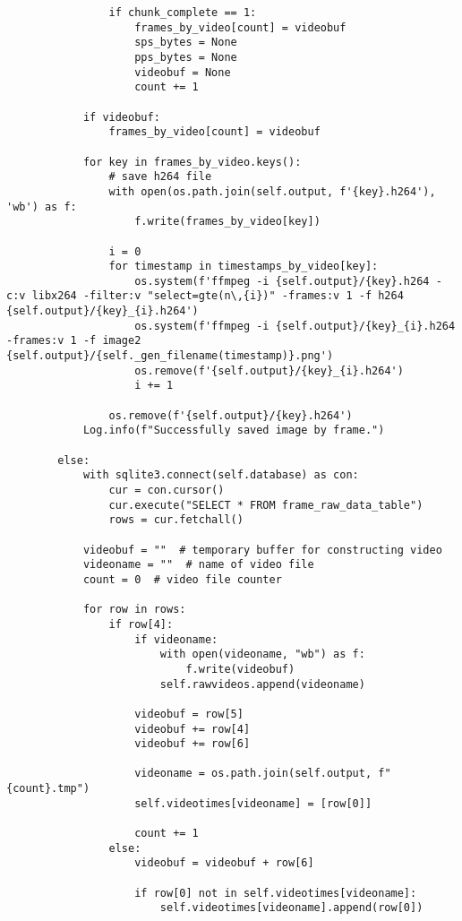 \documentclass{easychair}
\begin{document}
\begin{lstlisting}
                if chunk_complete == 1:
                    frames_by_video[count] = videobuf
                    sps_bytes = None
                    pps_bytes = None
                    videobuf = None
                    count += 1

            if videobuf:
                frames_by_video[count] = videobuf

            for key in frames_by_video.keys():
                # save h264 file
                with open(os.path.join(self.output, f'{key}.h264'), 'wb') as f:
                    f.write(frames_by_video[key])

                i = 0
                for timestamp in timestamps_by_video[key]:
                    os.system(f'ffmpeg -i {self.output}/{key}.h264 -c:v libx264 -filter:v "select=gte(n\,{i})" -frames:v 1 -f h264 {self.output}/{key}_{i}.h264')
                    os.system(f'ffmpeg -i {self.output}/{key}_{i}.h264 -frames:v 1 -f image2 {self.output}/{self._gen_filename(timestamp)}.png')
                    os.remove(f'{self.output}/{key}_{i}.h264')
                    i += 1

                os.remove(f'{self.output}/{key}.h264')
            Log.info(f"Successfully saved image by frame.")

        else:
            with sqlite3.connect(self.database) as con:
                cur = con.cursor()
                cur.execute("SELECT * FROM frame_raw_data_table")
                rows = cur.fetchall()

            videobuf = ""  # temporary buffer for constructing video
            videoname = ""  # name of video file
            count = 0  # video file counter

            for row in rows:
                if row[4]:
                    if videoname:
                        with open(videoname, "wb") as f:
                            f.write(videobuf)
                        self.rawvideos.append(videoname)

                    videobuf = row[5]
                    videobuf += row[4]
                    videobuf += row[6]

                    videoname = os.path.join(self.output, f"{count}.tmp")
                    self.videotimes[videoname] = [row[0]]

                    count += 1
                else:
                    videobuf = videobuf + row[6]

                    if row[0] not in self.videotimes[videoname]:
                        self.videotimes[videoname].append(row[0])


\end{lstlisting}
\end{document}
